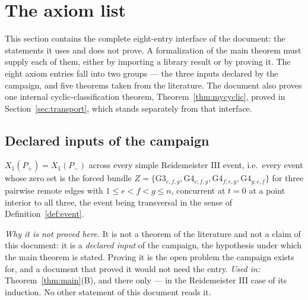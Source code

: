 \section{The axiom list}\label{sec:axioms}

This section contains the complete eight-entry interface of the document: the
statements it uses and does not prove. A formalization of the main theorem must
supply each of them, either by importing a library result or by proving it.
The eight axiom entries fall into two groups --- the three inputs declared by the
campaign, and five theorems taken from the literature. The document also proves
one internal cyclic-classification theorem, Theorem~\ref{thm:mycyclic}, proved in Section~\ref{sec:transport}, which stands separately from that interface.

\subsection{Declared inputs of the campaign}

\begin{axiom}\label{ax:R}
$X_1(P_+)=X_1(P_-)$ across every simple Reidemeister III event, i.e.\ every
event whose zero set is the forced bundle
$Z=\{\mathrm{G3}_{e,f,g},\mathrm{G4}_{e;f,g},\mathrm{G4}_{f;e,g},
\mathrm{G4}_{g;e,f}\}$ for three pairwise remote edges with
$1\leq e<f<g\leq n$, concurrent at $t=0$ at a point interior to all three, the
event being transversal in the sense of Definition~\ref{def:event}.

\emph{Why it is not proved here.} It is not a theorem of the literature and not
a claim of this document: it is a \emph{declared input} of the campaign, the
hypothesis under which the main theorem is stated. Proving it is the open
problem the campaign exists for, and a document that proved it would not need
the entry.
\emph{Used in:} Theorem~\ref{thm:main}(B), and there only --- in the Reidemeister
III case of its induction. No other statement of this document reads it.
\end{axiom}

